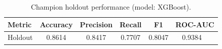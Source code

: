 \begin{table}[ht]
\centering
\small
\begin{tabular}{lccccc}
\toprule
Metric & Accuracy & Precision & Recall & F1 & ROC-AUC \\
\midrule
Holdout & 0.8614 & 0.8417 & 0.7707 & 0.8047 & 0.9384 \
\bottomrule
\end{tabular}
\caption{Champion holdout performance (model: XGBoost).}
\label{tab:holdout-metrics}
\end{table}